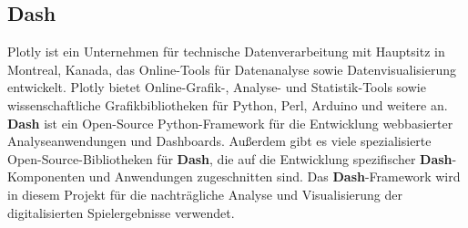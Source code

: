 \subsection{Dash} \label{sec:dash}
Plotly ist ein Unternehmen für technische Datenverarbeitung mit Hauptsitz in Montreal, Kanada, das Online-Tools für Datenanalyse sowie Datenvisualisierung entwickelt. 
Plotly bietet Online-Grafik-, Analyse- und Statistik-Tools sowie wissenschaftliche Grafikbibliotheken für Python, Perl, Arduino und weitere an.
\textbf{Dash} ist ein Open-Source Python-Framework für die Entwicklung webbasierter Analyseanwendungen und Dashboards. 
Außerdem gibt es viele spezialisierte Open-Source-Bibliotheken für \textbf{Dash}, die auf die Entwicklung spezifischer \textbf{Dash}-Komponenten und  Anwendungen zugeschnitten sind. Das \textbf{Dash}-Framework wird in diesem Projekt für die nachträgliche Analyse und Visualisierung der digitalisierten Spielergebnisse verwendet.
